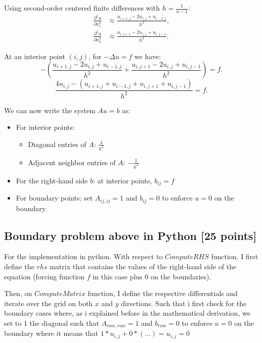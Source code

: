\documentclass[unicode,11pt,a4paper,oneside,numbers=endperiod,openany]{scrartcl}
\begin{document}
Using second-order centered finite differences with $h = \frac{1}{n-1}$:
\begin{align*}
    \frac{\partial^2 u}{\partial x_1^2} &\approx \frac{u_{i+1,j} - 2u_{i,j} + u_{i-1,j}}{h^2}, \\
    \frac{\partial^2 u}{\partial x_2^2} &\approx \frac{u_{i,j+1} - 2u_{i,j} + u_{i,j-1}}{h^2}.
\end{align*}

At an interior point $(i,j)$, for $-\Delta u = f$ we have:
\begin{equation}
    -\left( \frac{u_{i+1,j} - 2u_{i,j} + u_{i-1,j}}{h^2} + \frac{u_{i,j+1} - 2u_{i,j} + u_{i,j-1}}{h^2} \right) = f.
\end{equation}
\begin{equation}
    \frac{4u_{i,j} - (u_{i+1,j} + u_{i-1,j} + u_{i,j+1} + u_{i,j-1})}{h^2} = f.
\end{equation}

We can now write the system $A u = b$ as:
\begin{itemize}
    \item For interior points:
    \begin{itemize}
        \item Diagonal entries of $A$: $\frac{4}{h^2}$
        \item Adjacent neighbor entries of $A$: $-\frac{1}{h^2}$
    \end{itemize}
    \item For the right-hand side $b$: at interior points, $b_{ij} = f$ 
    \item For boundary points: set $A_{ij,ij} = 1$ and $b_{ij} = 0$ to enforce $u=0$ on the boundary.
\end{itemize}

\subsection{Boundary problem above in Python [25 points]}
For the implementation in python. With respect to $ComputeRHS$ function, I first define the $rhs$ matrix
that contains the values of the right-hand side of the equation (forcing function $f$ in this case plus 0 on the boundaries).

Then, on $ComputeMatrix$ function, I define the respective differentials and iterate over the grid on both $x$ and $y$ directions.
Such that i first check for the boundary cases where, as i explained before in the mathematical derivation, we set to 1 the diagonal 
such that $A_{row,row} = 1$ and $b_{row} = 0$ to enforce $u=0$ on the boundary where it means that $1 * u_{i,j} + 0 * (...) = u_{i,j} = 0$ 
\end{document}
